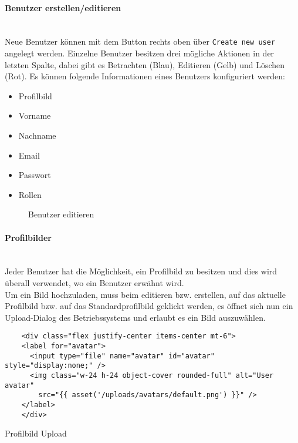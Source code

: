 \paragraph{Benutzer erstellen/editieren}\mbox{}\\

Neue Benutzer können mit dem Button rechts oben über \verb|Create new user| angelegt
werden. Einzelne Benutzer besitzen drei mögliche Aktionen in der letzten Spalte,
dabei gibt es Betrachten (Blau), Editieren (Gelb) und Löschen (Rot). Es können
folgende Informationen eines Benutzers konfiguriert werden:

\begin{itemize}
  \item Profilbild
  \item Vorname
  \item Nachname
  \item Email
  \item Passwort
  \item Rollen
\end{itemize}

\begin{figure}[H]
  \centering
  \caption{Benutzer editieren}
\end{figure}

\paragraph{Profilbilder}\mbox{}\\
Jeder Benutzer hat die Möglichkeit, ein Profilbild zu besitzen und dies wird
überall verwendet, wo ein Benutzer erwähnt wird.\\

Um ein Bild hochzuladen, muss beim editieren bzw. erstellen, auf das aktuelle Profilbild bzw.
auf das Standardprofilbild geklickt werden, es öffnet sich nun ein Upload-Dialog
des Betriebssystems und erlaubt es ein Bild auszuwählen.

\begin{listing}[H]
  \begin{verbatim}
    <div class="flex justify-center items-center mt-6">
    <label for="avatar">
      <input type="file" name="avatar" id="avatar" style="display:none;" />
      <img class="w-24 h-24 object-cover rounded-full" alt="User avatar"
        src="{{ asset('/uploads/avatars/default.png') }}" />
    </label>
    </div>
  \end{verbatim}
  \caption{Profilbild Upload}
\end{listing}

